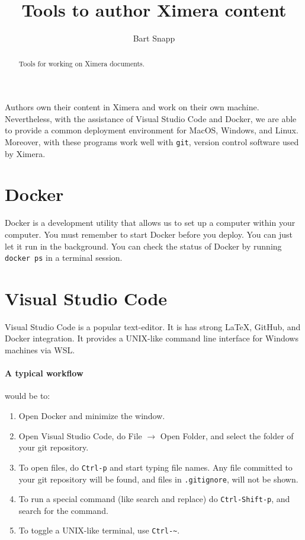\documentclass{ximera}
\title{Tools to author Ximera content}
\author{Bart Snapp}
\begin{document}
\begin{abstract}
      Tools for working on Ximera documents.
\end{abstract}
\maketitle

Authors own their content in Ximera and work on their own machine.
Nevertheless, with the assistance of Visual Studio Code and Docker, we are able
to provide a common deployment environment for MacOS, Windows, and Linux.
Moreover, with these programs work well with \verb!git!, version control
software used by Ximera.


\section{Docker}

Docker is a development utility that allows us to set up a computer
within your
computer. You must remember to start Docker before you deploy. You can just let
it run in the background. You can check the status of Docker by running
\verb!docker ps! in a terminal session.


\section{Visual Studio Code}

Visual Studio Code
is a popular text-editor. It is has strong \LaTeX, GitHub,
and Docker integration. It provides a UNIX-like command line interface for
Windows machines via WSL. 

\paragraph{A typical workflow} would be to:
\begin{enumerate}
      \item Open Docker and minimize the window.
      \item Open Visual Studio Code, do File $\to$ Open Folder, and select the
            folder of your git repository.
      \item To open files, do \verb!Ctrl-p! and start typing file names. Any
            file
            committed to your git repository will be found, and files in
            \verb!.gitignore!, will not be shown.
      \item To run a special command (like search and replace) do
            \verb!Ctrl-Shift-p!, and search for the command.
      \item To toggle a UNIX-like terminal, use \verb!Ctrl-~!.
\end{enumerate}
\end{document}
